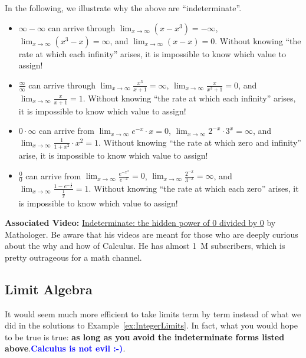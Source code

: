 In the following, we illustrate why the above are ``indeterminate''.
\begin{itemize}
    \item $\infty - \infty$ can arrive through $\displaystyle \lim_{x \to \infty} (x - x^3) = -\infty$, $\displaystyle \lim_{x \to \infty} (x^3 - x) = \infty$, and $\displaystyle \lim_{x \to \infty} (x - x) = 0$. Without knowing ``the rate at which each infinity'' arises, it is impossible to know which value to assign!
    \item $\frac{\infty}{\infty}$ can arrive through $\displaystyle \lim_{x \to \infty} \frac{x^3}{x+1} = \infty$, $\displaystyle \lim_{x \to \infty} \frac{x}{x^3 + 1} = 0$, and $\displaystyle \lim_{x \to \infty} \frac{x}{x+1}= 1$. Without knowing ``the rate at which each infinity'' arises, it is impossible to know which value to assign!
    \item $0 \cdot \infty$ can arrive from $\displaystyle \lim_{x \to \infty} e^{-x} \cdot x = 0$, $\displaystyle \lim_{x \to \infty} 2^{-x} \cdot 3^{x} = \infty$, and $\displaystyle \lim_{x \to \infty} \frac{1}{1+x^2} \cdot x^2 =1$. Without knowing ``the rate at which zero and infinity'' arise, it is impossible to know which value to assign! 
    \item $\frac{0}{0}$ can arrive from $\displaystyle \lim_{x \to \infty} \frac{e^{-x^2}}{e^{-x}}  = 0$, $\displaystyle \lim_{x \to \infty} \frac{2^{-x}} {3^{-x}} = \infty$, and $\displaystyle \lim_{x \to \infty} \frac{1 - e^{-\frac{1}{x}}}{\frac{1}{x}}  = 1$. Without knowing ``the rate at which each zero'' arises, it is impossible to know which value to assign!
\end{itemize}


\bigskip

\textbf{Associated Video:} \href{https://youtu.be/oc0M1o8tuPo}{Indeterminate: the hidden power of 0 divided by 0} by Mathologer. Be aware that his videos are meant for those who are deeply curious about the why and how of Calculus. He has almost 1~M subscribers, which is pretty outrageous for a math channel.



\subsection{Limit Algebra}
\label{sec:LimitAlgebra}

It would seem much more efficient to take limits term by term instead of what we did in the solutions to Example~\ref{ex:IntegerLimits}. In fact, what you would hope to be true is true: \textbf{as long as you avoid the indeterminate forms listed above}.\textcolor{blue}{\bf Calculus is not evil :-)}.\\

